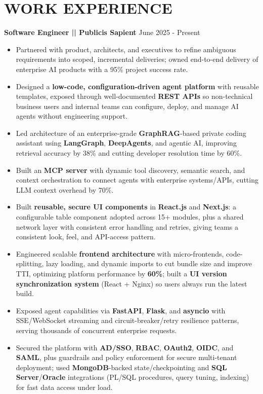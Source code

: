\documentclass[a4paper]{article}
\begin{document}
\section*{WORK EXPERIENCE}
\textbf{Software Engineer || Publicis Sapient}
\hfill June 2025 - Present
\begin{itemize}
\vspace{1pt}
\item {Partnered with product, architects, and executives to refine ambiguous requirements into scoped, incremental deliveries; owned end-to-end delivery of enterprise AI products with a 95\% project success rate.}
\item {Designed a \textbf{low-code, configuration-driven agent platform} with reusable templates, exposed through well-documented \textbf{REST APIs} so non-technical business users and internal teams can configure, deploy, and manage AI agents without engineering support.}
\item {Led architecture of an enterprise-grade \textbf{GraphRAG}-based private coding assistant using \textbf{LangGraph}, \textbf{DeepAgents}, and agentic AI, improving retrieval accuracy by 38\% and cutting developer resolution time by 60\%.}
\item {Built an \textbf{MCP server} with dynamic tool discovery, semantic search, and context orchestration to connect agents with enterprise systems/APIs, cutting LLM context overhead by 70\%.}
\item {Built \textbf{reusable, secure UI components} in \textbf{React.js} and \textbf{Next.js}: a configurable table component adopted across 15+ modules, plus a shared network layer with consistent error handling and retries, giving teams a consistent look, feel, and API-access pattern.}
\item {Engineered scalable \textbf{frontend architecture} with micro-frontends, code-splitting, lazy loading, and dynamic imports to cut bundle size and improve TTI, optimizing platform performance by \textbf{60\%}; built a \textbf{UI version synchronization system} (React + Nginx) so users always run the latest build.}
\item {Exposed agent capabilities via \textbf{FastAPI}, \textbf{Flask}, and \textbf{asyncio} with SSE/WebSocket streaming and circuit-breaker/retry resilience patterns, serving thousands of concurrent enterprise requests.}
\item {Secured the platform with \textbf{AD/SSO}, \textbf{RBAC}, \textbf{OAuth2}, \textbf{OIDC}, and \textbf{SAML}, plus guardrails and policy enforcement for secure multi-tenant deployment; used \textbf{MongoDB}-backed state/checkpointing and \textbf{SQL Server}/\textbf{Oracle} integrations (PL/SQL procedures, query tuning, indexing) for fast data access under load.}

\end{itemize}
\end{document}
